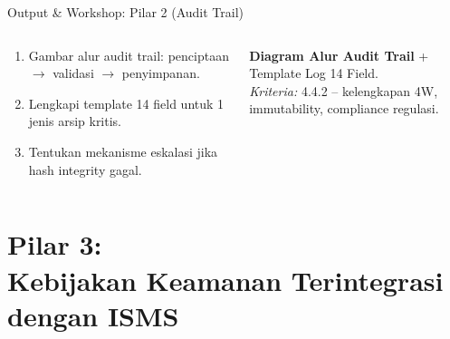 \documentclass[aspectratio=169,11pt]{beamer}
\begin{document}
\begin{frame}{Output \& Workshop: Pilar 2 (Audit Trail)}
    \vspace{0.2cm}
    \begin{columns}[T]
        \begin{premiumbox}
            \scriptsize
            \begin{enumerate}
                \item Gambar alur audit trail: penciptaan $\rightarrow$ validasi $\rightarrow$ penyimpanan.
                \item Lengkapi template 14 field untuk 1 jenis arsip kritis.
                \item Tentukan mekanisme eskalasi jika hash integrity gagal.
            \end{enumerate}
        \end{premiumbox}
        
        \begin{greenbox}[Portofolio 2]
            \scriptsize
            \textbf{Diagram Alur Audit Trail} + Template Log 14 Field.\\[0.1cm]
            \textit{Kriteria:} 4.4.2 -- kelengkapan 4W, immutability, compliance regulasi.
        \end{greenbox}
    \end{columns}
\end{frame}



\section{Pilar 3:\\Kebijakan Keamanan Terintegrasi dengan ISMS}
\end{document}
